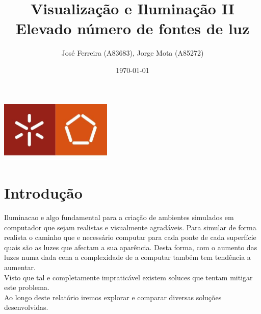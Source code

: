 \documentclass[a4paper]{report}
\begin{document}
\title{Visualização e Iluminação II\\Elevado número de fontes de luz}
\author{José Ferreira (A83683), Jorge Mota (A85272)}
\date{\today}

\begin{center}
    \begin{minipage}{0.75\linewidth}
        \centering
        \includegraphics[width=0.4\textwidth]{images/eng.jpeg}\par\vspace{1cm}
        \vspace{1.5cm}
        \href{https://www.uminho.pt/PT}
        {\color{black}{\scshape\LARGE Universidade do Minho}} \par
        \vspace{1cm}
        \href{https://www.di.uminho.pt/}
        {\color{black}{\scshape\Large Departamento de Informática}} \par
        \vspace{1.5cm}
        \maketitle
    \end{minipage}
\end{center}

\tableofcontents

\pagebreak
\chapter{Introdução}
Iluminacao e algo fundamental para a criação de ambientes simulados em
computador que sejam realistas e visualmente agradáveis. 
Para simular de forma realista o caminho que e necessário computar para cada
ponte de cada superfície quais são as luzes que afectam a sua aparência. Desta
forma,  com o aumento das luzes numa dada cena a complexidade de a computar
também tem tendência a aumentar.\\
Visto que tal e completamente impraticável existem soluces que tentam mitigar
este problema.\\
Ao longo deste relatório iremos explorar e comparar diversas soluções
desenvolvidas.
\end{document}
